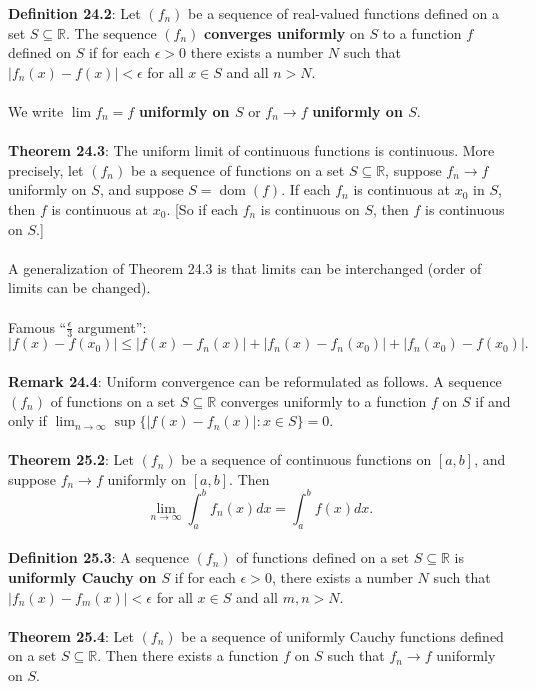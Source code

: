 \documentclass{article}
\theoremstyle{definition}
\DeclareMathOperator{\Sup}{sup}
\DeclareMathOperator{\Dom}{dom}
\begin{document}
\textbf{Definition 24.2}: Let $(f_n)$ be a sequence of real-valued functions defined on a set $S \subseteq \mathbb{R}$. The sequence $(f_n)$ \textbf{converges uniformly} on $S$ to a function $f$ defined on $S$ if for each $\epsilon > 0$ there exists a number $N$ such that $|f_n(x) - f(x)| < \epsilon$ for all $x \in S$ and all $n > N$. \\ \\
We write $\lim f_n = f$ \textbf{uniformly on $S$} or $f_n \rightarrow f$ \textbf{uniformly on $S$}. \\ \\
\textbf{Theorem 24.3}: The uniform limit of continuous functions is continuous. More precisely, let $(f_n)$ be a sequence of functions on a set $S \subseteq \mathbb{R}$, suppose $f_n \rightarrow f$ uniformly on $S$, and suppose $S = \Dom(f)$. If each $f_n$ is continuous at $x_0$ in $S$, then $f$ is continuous at $x_0$. [So if each $f_n$ is continuous on $S$, then $f$ is continuous on $S$.] \\ \\
A generalization of Theorem 24.3 is that limits can be interchanged (order of limits can be changed). \\ \\
Famous ``$\frac{\epsilon}{3}$ argument'': $$|f(x) - f(x_0)| \leq |f(x) - f_n(x)| + |f_n(x) - f_n(x_0)| + |f_n(x_0) - f(x_0)|.$$ \\
\textbf{Remark 24.4}: Uniform convergence can be reformulated as follows. A sequence $(f_n)$ of functions on a set $S \subseteq \mathbb{R}$ converges uniformly to a function $f$ on $S$ if and only if $\lim_{n \rightarrow \infty} \Sup\{|f(x) - f_n(x)| : x \in S\} = 0$. \\ \\
\textbf{Theorem 25.2}: Let $(f_n)$ be a sequence of continuous functions on $[a, b]$, and suppose $f_n \rightarrow f$ uniformly on $[a, b]$. Then $$\lim_{n \rightarrow \infty} \int_a^b f_n(x) dx = \int_a^b f(x)dx.$$ \\
\textbf{Definition 25.3}: A sequence $(f_n)$ of functions defined on a set $S \subseteq \mathbb{R}$ is \textbf{uniformly
Cauchy on $S$} if for each $\epsilon > 0$, there exists a number $N$ such that $|f_n(x) - f_m(x)| < \epsilon$ for all $x \in S$ and all $m, n > N$. \\ \\
\textbf{Theorem 25.4}: Let $(f_n)$ be a sequence of uniformly Cauchy functions defined on a set $S \subseteq \mathbb{R}$. Then there exists a function $f$ on $S$ such that $f_n \rightarrow f$ uniformly on $S$. \\ \\
\end{document}
